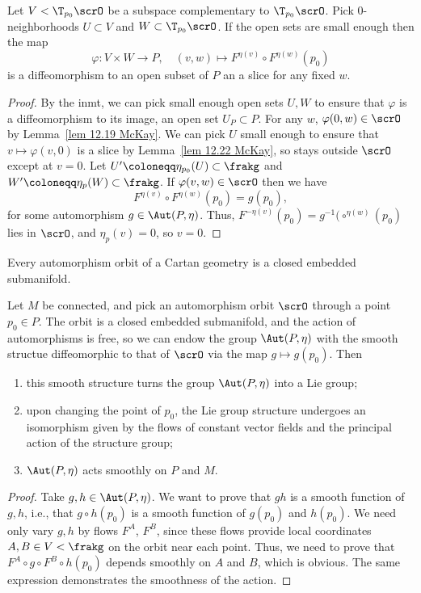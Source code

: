 \begin{lem}\label{lem 12.23 McKay}
    Let $V<\T_{p_0}\scrO$ be a subspace complementary to $\T_{p_0}\scrO$. Pick $0$-neighborhoods $U\subset V$ and $W\subset \T_{p_0}\scrO$. If the open sets are small enough then the map 
    \[\varphi:V\times W\to P,\quad (v,w)\mapsto F^{\eta(v)}\circ F^{\eta(w)}(p_0)\]
    is a diffeomorphism to an open subset of $P$ an a slice for any fixed $w$.
\end{lem}
\begin{proof}
    By the \gls{inmt}, we can pick small enough open sets $U,W$ to ensure that $\varphi$ is a diffeomorphism to its image, an open set $U_P\subset P$. For any $w$, $\varphi(0,w)\in\scrO$ by Lemma~\ref{lem 12.19 McKay}. We can pick $U$ small enough to ensure that $v\mapsto \varphi(v,0)$ is a slice by Lemma~\ref{lem 12.22 McKay}, so stays outside $\scrO$ except at $v=0$. Let $U'\coloneqq \eta_{p_0}(U)\subset \frakg$ and $W'\coloneqq \eta_p(W)\subset \frakg$. If $\varphi(v,w)\in\scrO$ then we have 
    \[F^{\eta(v)}\circ F^{\eta(w)}(p_0)=g(p_0),\]
    for some automorphism $g\in\Aut(P,\eta)$. Thus, $F^{-\eta(v)}(p_0)=g^{-1}(\circ ^{\eta(w)}(p_0)$ lies in $\scrO$, and $\eta_p(v)=0$, so $v=0$.
\end{proof}

\begin{cor}
    Every automorphism orbit of a Cartan geometry is a closed embedded submanifold.
\end{cor}

\begin{cor}
    Let $M$ be connected, and pick an automorphism orbit $\scrO$ through a point $p_0\in P$. The orbit is a closed embedded submanifold, and the action of automorphisms is free, so we can endow the group $\Aut(P,\eta)$ with the smooth structue diffeomorphic to that of $\scrO$ via the map $g\mapsto g(p_0)$. Then 
    \begin{enumerate}
        \item this smooth structure turns the group $\Aut(P,\eta)$ into a Lie group;
        \item upon changing the point of $p_0$, the Lie group structure undergoes an isomorphism given by the flows of constant vector fields and the principal action of the structure group;
        \item $\Aut(P,\eta)$ acts smoothly on $P$ and $M$.
    \end{enumerate}
\end{cor}
\begin{proof}
    Take $g,h\in\Aut(P,\eta)$. We want to prove that $gh$ is a smooth function of $g,h$, i.e., that $g\circ h(p_0)$ is a smooth function of $g(p_0)$ and $h(p_0)$. We need only vary $g,h$ by flows $F^A$, $F^B$, since these flows provide local coordinates $A,B\in V<\frakg$ on the orbit near each point. Thus, we need to prove that $F^A\circ g\circ F^B\circ h(p_0)$
    depends smoothly on $A$ and $B$, which is obvious. The same expression demonstrates the smoothness of the action.
\end{proof}

